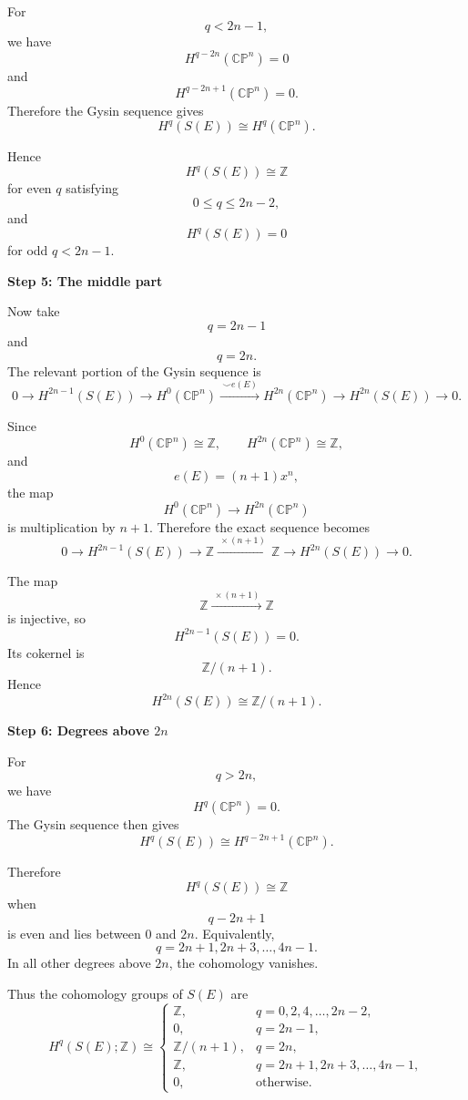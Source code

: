 \begin{solution}
For
\[
q<2n-1,
\]
we have
\[
H^{q-2n}(\mathbb{CP}^n)=0
\]
and
\[
H^{q-2n+1}(\mathbb{CP}^n)=0.
\]
Therefore the Gysin sequence gives
\[
H^q(S(E))\cong H^q(\mathbb{CP}^n).
\]

Hence
\[
H^q(S(E))\cong \mathbb Z
\]
for even \(q\) satisfying
\[
0\le q\le 2n-2,
\]
and
\[
H^q(S(E))=0
\]
for odd \(q<2n-1\).


\medskip
\noindent\textbf{Step 5: The middle part}\par
\smallskip


Now take
\[
q=2n-1
\]
and
\[
q=2n.
\]
The relevant portion of the Gysin sequence is
\[
0
\longrightarrow
H^{2n-1}(S(E))
\longrightarrow
H^0(\mathbb{CP}^n)
\xrightarrow{\ \smile e(E)\ }
H^{2n}(\mathbb{CP}^n)
\longrightarrow
H^{2n}(S(E))
\longrightarrow
0.
\]

Since
\[
H^0(\mathbb{CP}^n)\cong \mathbb Z,
\qquad
H^{2n}(\mathbb{CP}^n)\cong \mathbb Z,
\]
and
\[
e(E)=(n+1)x^n,
\]
the map
\[
H^0(\mathbb{CP}^n)\longrightarrow H^{2n}(\mathbb{CP}^n)
\]
is multiplication by \(n+1\). Therefore the exact sequence becomes
\[
0
\longrightarrow
H^{2n-1}(S(E))
\longrightarrow
\mathbb Z
\xrightarrow{\ \times(n+1)\ }
\mathbb Z
\longrightarrow
H^{2n}(S(E))
\longrightarrow
0.
\]

The map
\[
\mathbb Z\xrightarrow{\ \times(n+1)\ }\mathbb Z
\]
is injective, so
\[
H^{2n-1}(S(E))=0.
\]
Its cokernel is
\[
\mathbb Z/(n+1).
\]
Hence
\[
H^{2n}(S(E))\cong \mathbb Z/(n+1).
\]


\medskip
\noindent\textbf{Step 6: Degrees above \(2n\)}\par
\smallskip


For
\[
q>2n,
\]
we have
\[
H^q(\mathbb{CP}^n)=0.
\]
The Gysin sequence then gives
\[
H^q(S(E))\cong H^{q-2n+1}(\mathbb{CP}^n).
\]

Therefore
\[
H^q(S(E))\cong \mathbb Z
\]
when
\[
q-2n+1
\]
is even and lies between \(0\) and \(2n\). Equivalently,
\[
q=2n+1,2n+3,\ldots,4n-1.
\]
In all other degrees above \(2n\), the cohomology vanishes.

Thus the cohomology groups of \(S(E)\) are
\[
H^q(S(E);\mathbb Z)\cong
\begin{cases}
	\mathbb Z, & q=0,2,4,\ldots,2n-2,\\[1mm]
	0, & q=2n-1,\\[1mm]
	\mathbb Z/(n+1), & q=2n,\\[1mm]
	\mathbb Z, & q=2n+1,2n+3,\ldots,4n-1,\\[1mm]
	0, & \text{otherwise}.
\end{cases}
\]



\end{solution}
